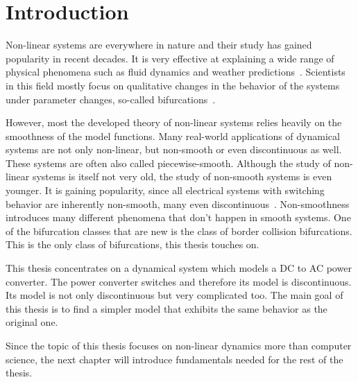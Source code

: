 \chapter{Introduction}
\label{chap:intro}

Non-linear systems are everywhere in nature and their study has gained popularity in recent decades.
It is very effective at explaining a wide range of physical phenomena such as fluid dynamics and weather predictions~\cite{bernardo2008piecewise}.
Scientists in this field mostly focus on qualitative changes in the behavior of the systems under parameter changes, so-called bifurcations~\cite{simpson2010}.

However, most the developed theory of non-linear systems relies heavily on the smoothness of the model functions.
Many real-world applications of dynamical systems are not only non-linear, but non-smooth or even discontinuous as well.
These systems are often also called piecewise-smooth.
Although the study of non-linear systems is itself not very old, the study of non-smooth systems is even younger.
It is gaining popularity, since all electrical systems with switching behavior are inherently non-smooth, many even discontinuous~\cite{simpson2010}.
Non-smoothness introduces many different phenomena that don't happen in smooth systems.
One of the bifurcation classes that are new is the class of border collision bifurcations.
This is the only class of bifurcations, this thesis touches on.

This thesis concentrates on a dynamical system which models a DC to AC power converter.
The power converter switches and therefore its model is discontinuous.
Its model is not only discontinuous but very complicated too.
The main goal of this thesis is to find a simpler model that exhibits the same behavior as the original one.

Since the topic of this thesis focuses on non-linear dynamics more than computer science, the next chapter will introduce fundamentals needed for the rest of the thesis.
